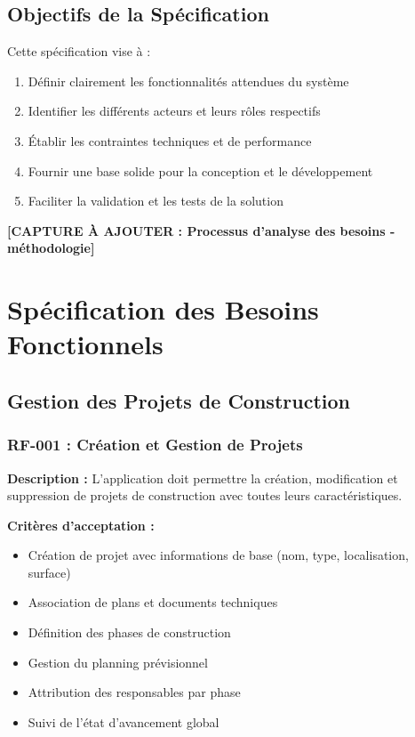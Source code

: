 \subsection{Objectifs de la Spécification}

Cette spécification vise à :

\begin{enumerate}
    \item Définir clairement les fonctionnalités attendues du système
    \item Identifier les différents acteurs et leurs rôles respectifs
    \item Établir les contraintes techniques et de performance
    \item Fournir une base solide pour la conception et le développement
    \item Faciliter la validation et les tests de la solution
\end{enumerate}

\textbf{[CAPTURE À AJOUTER : Processus d'analyse des besoins - méthodologie]}


\section{Spécification des Besoins Fonctionnels}

\subsection{Gestion des Projets de Construction}

\subsubsection{RF-001 : Création et Gestion de Projets}

\textbf{Description :} L'application doit permettre la création, modification et suppression de projets de construction avec toutes leurs caractéristiques.

\textbf{Critères d'acceptation :}
\begin{itemize}
    \item Création de projet avec informations de base (nom, type, localisation, surface)
    \item Association de plans et documents techniques
    \item Définition des phases de construction
    \item Gestion du planning prévisionnel
    \item Attribution des responsables par phase
    \item Suivi de l'état d'avancement global
\end{itemize}

